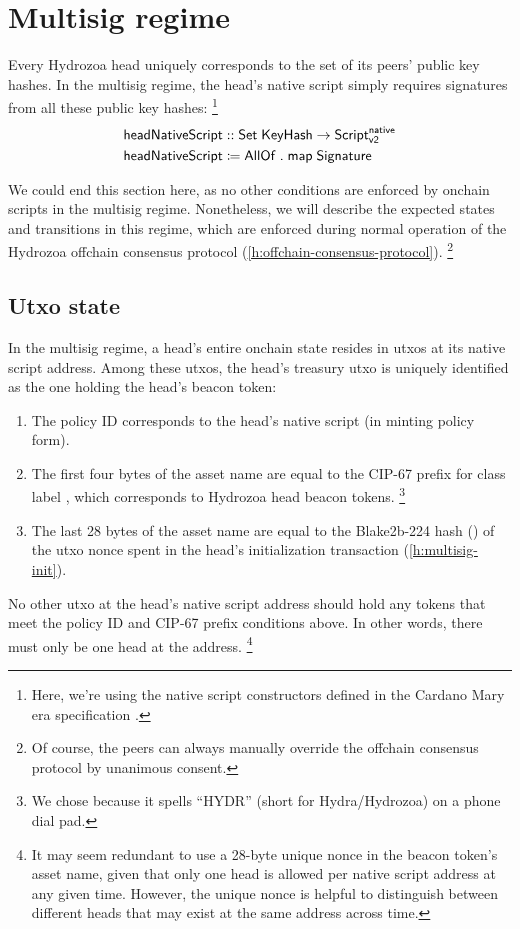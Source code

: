 \documentclass[../hydrozoa.tex]{subfiles}
\begin{document}
\section{Multisig regime}%
\label{h:multisig-regime}%
Every Hydrozoa head uniquely corresponds to the set of its peers' public key hashes.
In the multisig regime, the head's native script simply requires signatures from all these public key hashes:%
\footnote{Here, we're using the native script constructors defined in the Cardano Mary era specification \citep{PolinaVinogradovaAndreKnispelFormalSpecificationCardano2020}.}
\begin{equation*}
\begin{split}
  \mathsf{headNativeScript} &:: \mathsf{Set} \; \mathsf{KeyHash} -> \mathsf{Script}^{\mathsf{native}}_{\mathsf{v2}} \\
  \mathsf{headNativeScript} &\coloneq
    \mathsf{AllOf} \;.\; \mathsf{map} \; \mathsf{Signature}
\end{split}
\end{equation*}

We could end this section here, as no other conditions are enforced by onchain scripts in the multisig regime.
Nonetheless, we will describe the expected states and transitions in this regime, which are enforced during normal operation of the Hydrozoa offchain consensus protocol (\cref{h:offchain-consensus-protocol}).%
\footnote{Of course, the peers can always manually override the offchain consensus protocol by unanimous consent.}

\subsection{Utxo state}%
\label{h:multisig-utxo-state}%
In the multisig regime, a head's entire onchain state resides in utxos at its native script address.
Among these utxos, the head's treasury utxo is uniquely identified as the one holding the head's beacon token:
\begin{enumerate}
  \item The policy ID corresponds to the head's native script (in minting policy form).
  \item The first four bytes of the asset name are equal to the CIP-67
    \citep{AlessandroKonradThomasVellekoopCIP67AssetName2022}
    prefix for class label , which corresponds to Hydrozoa head beacon tokens.%
    \footnote{We chose  because it spells ``HYDR'' (short for Hydra/Hydrozoa) on a phone dial pad.}
  \item The last 28 bytes of the asset name are equal to the Blake2b-224 hash () of the utxo nonce spent in the head's initialization transaction (\cref{h:multisig-init}).
\end{enumerate}
No other utxo at the head's native script address should hold any tokens that meet the policy ID and CIP-67 prefix conditions above. In other words, there must only be one head at the address.%
\footnote{It may seem redundant to use a 28-byte unique nonce in the beacon token's asset name, given that only one head is allowed per native script address at any given time.
  However, the unique nonce is helpful to distinguish between different heads that may exist at the same address across time.}
\end{document}
